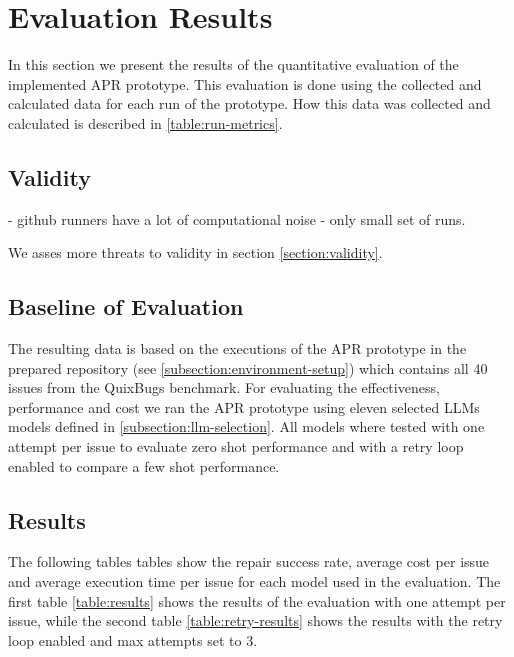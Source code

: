 \section{Evaluation Results} \label{section:evaluation-results}

In this section we present the results of the quantitative evaluation of the implemented APR prototype. This evaluation is done using the collected and calculated data for each run of the prototype. How this data was collected and calculated is described in \ref{table:run-metrics}.

\subsection{Validity}
- github runners have a lot of computational noise
- only small set of runs.

We asses more threats to validity in section \ref{section:validity}.

\subsection{Baseline of Evaluation}
The resulting data is based on the executions of the APR prototype in the prepared repository (see \ref{subsection:environment-setup}) which contains all 40 issues from the QuixBugs benchmark. For evaluating the effectiveness, performance and cost we ran the APR prototype using eleven selected LLMs models defined in \ref{subsection:llm-selection}. All models where tested with one attempt per issue to evaluate zero shot performance and with a retry loop enabled to compare a few shot performance.
\subsection{Results}
The following tables tables show the repair success rate, average cost per issue and average execution time per issue for each model used in the evaluation. The first table \ref{table:results} shows the results of the evaluation with one attempt per issue, while the second table \ref{table:retry-results} shows the results with the retry loop enabled and max attempts set to 3.

